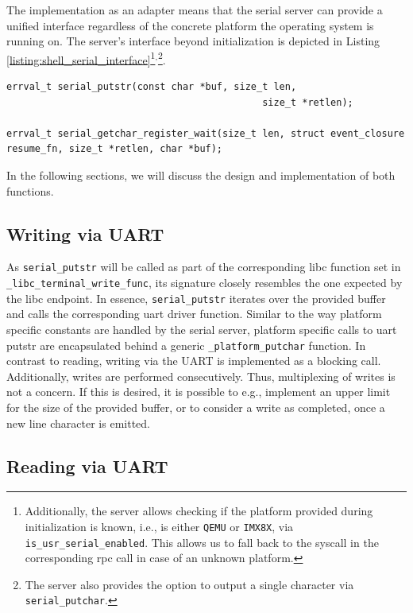The implementation as an adapter means that the serial server can provide a unified interface regardless of the concrete platform the operating system is running on. The server's interface beyond initialization is depicted in Listing \ref{listing:shell_serial_interface}\footnote{Additionally, the server allows checking if the platform provided during initialization is known, i.e., is either \texttt{QEMU} or \texttt{IMX8X}, via \texttt{is\_usr\_serial\_enabled}. This allows us to fall back to the syscall in the corresponding rpc call in case of an unknown platform.}$^{,}$\footnote{The server also provides the option to output a single character via \texttt{serial\_putchar}.}.

\begin{lstlisting}[caption={Serial Driver: UART Interface},label={listing:shell_serial_interface}]
errval_t serial_putstr(const char *buf, size_t len,
											 size_t *retlen);

errval_t serial_getchar_register_wait(size_t len, struct event_closure resume_fn, size_t *retlen, char *buf);
\end{lstlisting}

In the following sections, we will discuss the design and implementation of both functions.

\subsection{Writing via UART}

As \texttt{serial\_putstr} will be called as part of the corresponding libc function set in \texttt{\_libc\_terminal\_write\_func}, its signature closely resembles the one expected by the libc endpoint. In essence, \texttt{serial\_putstr} iterates over the provided buffer and calls the corresponding uart driver function. Similar to the way platform specific constants are handled by the serial server, platform specific calls to uart putstr are encapsulated behind a generic \texttt{\_platform\_putchar} function. In contrast to reading, writing via the UART is implemented as a blocking call. Additionally, writes are performed consecutively. Thus, multiplexing of writes is not a concern. If this is desired, it is possible to e.g., implement an upper limit for the size of the provided buffer, or to consider a write as completed, once a new line character is emitted.

\subsection{Reading via UART} \label{sec:shell_read_uart}

